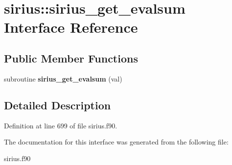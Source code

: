 \hypertarget{interfacesirius_1_1sirius__get__evalsum}{}\section{sirius\+:\+:sirius\+\_\+get\+\_\+evalsum Interface Reference}
\label{interfacesirius_1_1sirius__get__evalsum}
\subsection*{Public Member Functions}
\begin{DoxyCompactItemize}
\item 
\hypertarget{interfacesirius_1_1sirius__get__evalsum_afb6f59921e8bdf0100711f2becaaec2f}{}subroutine {\bfseries sirius\+\_\+get\+\_\+evalsum} (val)\label{interfacesirius_1_1sirius__get__evalsum_afb6f59921e8bdf0100711f2becaaec2f}

\end{DoxyCompactItemize}


\subsection{Detailed Description}


Definition at line 699 of file sirius.\+f90.



The documentation for this interface was generated from the following file\+:\begin{DoxyCompactItemize}
\item 
sirius.\+f90\end{DoxyCompactItemize}
